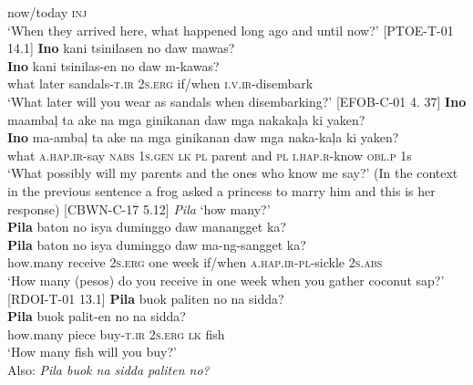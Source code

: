 now/today  \textsc{inj} \\
\glt `When they arrived here, what happened long ago and until now?’  [PTOE-T-01 14.1]
\z
\ea
\textbf{Ino}  kani  tsinilasen  no  daw  mawas? \\\smallskip
\gll \textbf{Ino}  kani  tsinilas-en  no  daw  m-kawas? \\
what  later  sandals-\textsc{t.ir}  2\textsc{s.erg}  if/when  \textsc{i.v.ir}-disembark \\
\glt ‘What later will you wear as sandals when disembarking?’ [EFOB-C-01 4. 37]
\z
\ea
\textbf{Ino}   maambaļ  ta  ake  na  mga  ginikanan  daw  mga  nakakaļa ki  yaken? \\\smallskip
\gll \textbf{Ino}   ma-ambaļ  ta  ake  na  mga  ginikanan  daw  mga  naka-kaļa ki  yaken? \\
what  \textsc{a.hap.ir}-say  \textsc{nabs}  1\textsc{s.gen}  \textsc{lk}  \textsc{pl}  parent  and  \textsc{pl}  \textsc{i.hap.r}-know
\textsc{obl.p}  1s \\
\glt `What possibly will my parents and the ones who know me say?’ (In the context in the previous sentence a frog asked a princess to marry him and this is her response) [CBWN-C-17 5.12]
\z
\ea
\textit{Pila} ‘how many?’ \\
\textbf{Pila}  baton  no  isya  duminggo  daw  manangget ka? \\\smallskip
\gll \textbf{Pila}  baton  no  isya  duminggo  daw  ma-ng-sangget ka? \\
how.many  receive  2\textsc{s.erg}  one  week  if/when  \textsc{a.hap.ir-pl}-sickle
2\textsc{s.abs} \\
\glt ‘How many (pesos) do you receive in one week when you gather coconut sap?’ [RDOI-T-01 13.1]
\z
\ea
\textbf{Pila}  buok  paliten  no  na  sidda? \\\smallskip
\gll \textbf{Pila}  buok  palit-en  no  na  sidda? \\
how.many  piece  buy-\textsc{t.ir}  2\textsc{s.erg}  \textsc{lk}  fish \\
\glt ‘How many fish will you buy?’ \\\smallskip
Also: \textit{Pila buok na sidda paliten no?}
\z

